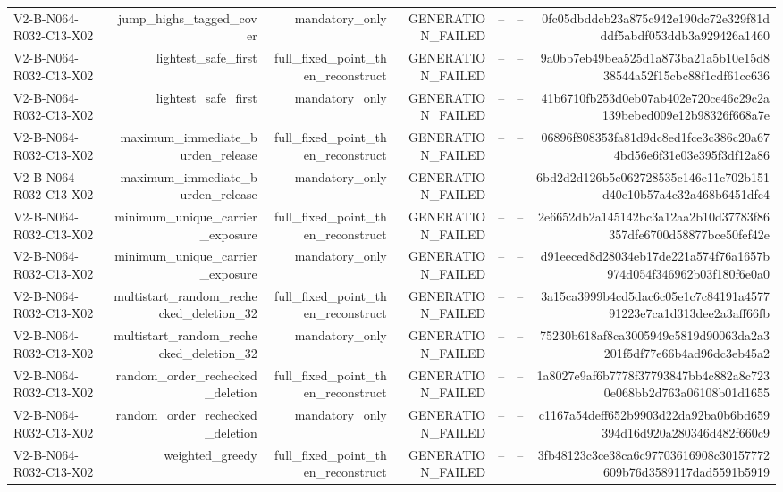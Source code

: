 {\begin{longtable}{lrrrrrr}
V2-B-N064-R032-C13-X02 & jump\_highs\_tagged\_cover & mandatory\_only & GENERATION\_FAILED & -- & -- & 0fc05dbddcb23a875c942e190dc72e329f81dddf5abdf053ddb3a929426a1460 \\
V2-B-N064-R032-C13-X02 & lightest\_safe\_first & full\_fixed\_point\_then\_reconstruct & GENERATION\_FAILED & -- & -- & 9a0bb7eb49bea525d1a873ba21a5b10e15d838544a52f15cbc88f1cdf61cc636 \\
V2-B-N064-R032-C13-X02 & lightest\_safe\_first & mandatory\_only & GENERATION\_FAILED & -- & -- & 41b6710fb253d0eb07ab402e720ce46c29c2a139bebed009e12b98326f668a7e \\
V2-B-N064-R032-C13-X02 & maximum\_immediate\_burden\_release & full\_fixed\_point\_then\_reconstruct & GENERATION\_FAILED & -- & -- & 06896f808353fa81d9dc8ed1fce3c386c20a674bd56e6f31e03e395f3df12a86 \\
V2-B-N064-R032-C13-X02 & maximum\_immediate\_burden\_release & mandatory\_only & GENERATION\_FAILED & -- & -- & 6bd2d2d126b5c062728535c146e11c702b151d40e10b57a4c32a468b6451dfc4 \\
V2-B-N064-R032-C13-X02 & minimum\_unique\_carrier\_exposure & full\_fixed\_point\_then\_reconstruct & GENERATION\_FAILED & -- & -- & 2e6652db2a145142bc3a12aa2b10d37783f86357dfe6700d58877bce50fef42e \\
V2-B-N064-R032-C13-X02 & minimum\_unique\_carrier\_exposure & mandatory\_only & GENERATION\_FAILED & -- & -- & d91eeced8d28034eb17de221a574f76a1657b974d054f346962b03f180f6e0a0 \\
V2-B-N064-R032-C13-X02 & multistart\_random\_rechecked\_deletion\_32 & full\_fixed\_point\_then\_reconstruct & GENERATION\_FAILED & -- & -- & 3a15ca3999b4cd5dac6c05e1c7c84191a457791223e7ca1d313dee2a3aff66fb \\
V2-B-N064-R032-C13-X02 & multistart\_random\_rechecked\_deletion\_32 & mandatory\_only & GENERATION\_FAILED & -- & -- & 75230b618af8ca3005949c5819d90063da2a3201f5df77e66b4ad96dc3eb45a2 \\
V2-B-N064-R032-C13-X02 & random\_order\_rechecked\_deletion & full\_fixed\_point\_then\_reconstruct & GENERATION\_FAILED & -- & -- & 1a8027e9af6b7778f37793847bb4c882a8c7230e068bb2d763a06108b01d1655 \\
V2-B-N064-R032-C13-X02 & random\_order\_rechecked\_deletion & mandatory\_only & GENERATION\_FAILED & -- & -- & c1167a54deff652b9903d22da92ba0b6bd659394d16d920a280346d482f660c9 \\
V2-B-N064-R032-C13-X02 & weighted\_greedy & full\_fixed\_point\_then\_reconstruct & GENERATION\_FAILED & -- & -- & 3fb48123c3ce38ca6c97703616908c30157772609b76d3589117dad5591b5919 \\

\end{longtable}}
